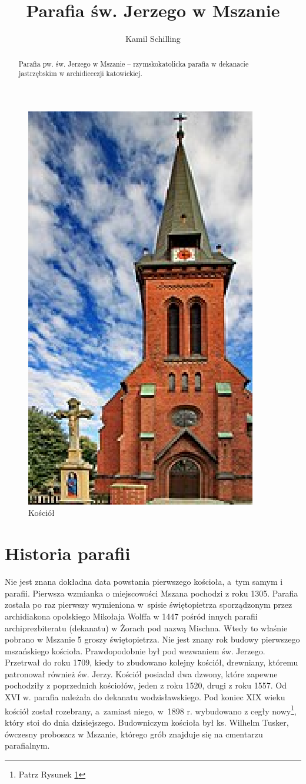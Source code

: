 \documentclass[a4paper,12pt]{article}
\title{Parafia św. Jerzego w Mszanie}
\author{Kamil Schilling}
\begin{document}
\maketitle

\begin{abstract}\noindent Parafia pw. św. Jerzego w Mszanie – rzymskokatolicka parafia w dekanacie jastrzębskim w archidiecezji katowickiej.
\end{abstract}

\begin{figure}[h]
\centering
\includegraphics[width=0.3\hsize]{kos.eps}
\caption{Kościół}\label{kosciol}
\end{figure}

\section{Historia parafii}

Nie jest znana dokładna data powstania pierwszego kościoła, a~tym samym i parafii. Pierwsza wzmianka o miejscowości Mszana pochodzi z roku 1305. Parafia została po raz pierwszy wymieniona w~spisie świętopietrza sporządzonym przez archidiakona opolskiego Mikołaja Wolffa w 1447 pośród innych parafii archiprezbiteratu (dekanatu) w Żorach pod nazwą Mischna.
Wtedy to właśnie pobrano w Mszanie 5 groszy świętopietrza. Nie jest znany rok budowy pierwszego mszańskiego kościoła. Prawdopodobnie był pod wezwaniem św. Jerzego. Przetrwał do roku 1709, kiedy to zbudowano kolejny kościół, drewniany, któremu patronował również św. Jerzy. Kościół posiadał dwa dzwony, które zapewne pochodziły z poprzednich kościołów, jeden z roku 1520, drugi z roku 1557. Od XVI w. parafia należała do dekanatu wodzisławskiego. Pod koniec XIX wieku kościół został rozebrany, a~zamiast niego, w~1898 r. wybudowano z cegły nowy\footnote{Patrz Rysunek \ref{kosciol}}, który stoi do dnia dzisiejszego. Budowniczym kościoła był ks. Wilhelm Tusker, ówczesny proboszcz w Mszanie, którego grób znajduje się na cmentarzu parafialnym.
\end{document}
